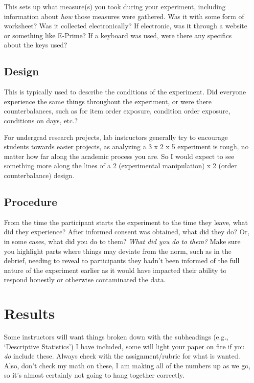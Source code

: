 \documentclass[stu,12pt,floatsintext]{apa7}
\begin{document}
This sets up what measure(s) you took during your experiment, including information about \textit{how} those measures were gathered. Was it with some form of worksheet? Was it collected electronically? If electronic, was it through a website or something like E-Prime? If a keyboard was used, were there any specifics about the keys used?

\subsection{Design}

This is typically used to describe the conditions of the experiment. Did everyone experience the same things throughout the experiment, or were there counterbalances, such as for item order exposure, condition order exposure, conditions on days, etc.? 

For undergrad research projects, lab instructors generally try to encourage students towards easier projects, as analyzing a 3 x 2 x 5 experiment is rough, no matter how far along the academic process you are. So I would expect to see something more along the lines of a 2 (experimental manipulation) x 2 (order counterbalance) design.


\subsection{Procedure}

From the time the participant starts the experiment to the time they leave, what did they experience? After informed consent was obtained, what did they do? Or, in some cases, what did you do to them? \textit{What did you do to them?} Make sure you highlight parts where things may deviate from the norm, such as in the debrief, needing to reveal to participants they hadn't been informed of the full nature of the experiment earlier as it would have impacted their ability to respond honestly or otherwise contaminated the data.



\section{Results}

Some instructors will want things broken down with the subheadings (e.g., `Descriptive Statistics') I have included, some will light your paper on fire if you \textit{do} include these. Always check with the assignment/rubric for what is wanted. Also, don't check my math on these, I am making all of the numbers up as we go, so it's almost certainly not going to hang together correctly.
\end{document}
